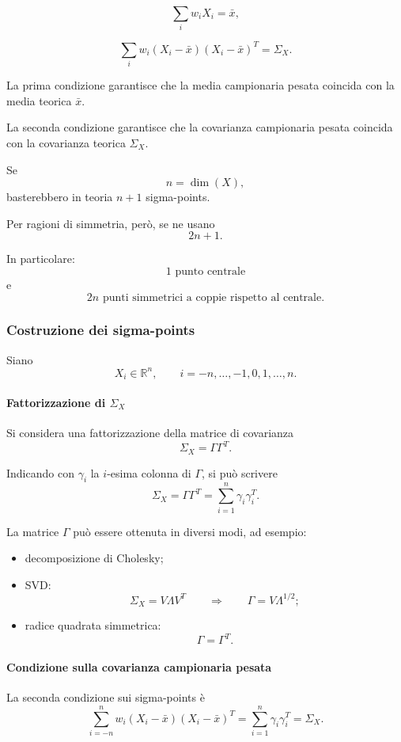 \documentclass[11pt,a4paper]{article}
\begin{document}
\[
\sum_i w_i X_i = \bar x,
\tag{1}
\]

\[
\sum_i w_i (X_i-\bar x)(X_i-\bar x)^T = \Sigma_X.
\tag{2}
\]

La prima condizione garantisce che la media campionaria pesata coincida con la media teorica \(\bar x\).

La seconda condizione garantisce che la covarianza campionaria pesata coincida con la covarianza teorica \(\Sigma_X\).

Se
\[
n=\dim(X),
\]
basterebbero in teoria \(n+1\) sigma-points.

Per ragioni di simmetria, però, se ne usano
\[
2n+1.
\]

In particolare:
\[
1 \text{ punto centrale}
\]
e
\[
2n \text{ punti simmetrici a coppie rispetto al centrale}.
\]

\subsubsection*{Costruzione dei sigma-points}

Siano
\[
X_i\in\mathbb{R}^n,
\qquad
i=-n,\dots,-1,0,1,\dots,n.
\]

\paragraph{Fattorizzazione di \(\Sigma_X\)}
Si considera una fattorizzazione della matrice di covarianza
\[
\Sigma_X=\Gamma\Gamma^T.
\]

Indicando con \(\gamma_i\) la \(i\)-esima colonna di \(\Gamma\), si può scrivere
\[
\Sigma_X
=
\Gamma\Gamma^T
=
\sum_{i=1}^{n}\gamma_i\gamma_i^T.
\]

La matrice \(\Gamma\) può essere ottenuta in diversi modi, ad esempio:
\begin{itemize}
    \item decomposizione di Cholesky;
    \item SVD:
    \[
    \Sigma_X=V\Lambda V^T
    \qquad\Rightarrow\qquad
    \Gamma=V\Lambda^{1/2};
    \]
    \item radice quadrata simmetrica:
    \[
    \Gamma=\Gamma^T.
    \]
\end{itemize}

\paragraph{Condizione sulla covarianza campionaria pesata}

La seconda condizione sui sigma-points è
\[
\sum_{i=-n}^{n} w_i(X_i-\bar x)(X_i-\bar x)^T
=
\sum_{i=1}^{n}\gamma_i\gamma_i^T
=
\Sigma_X.
\tag{2}
\]
\end{document}
